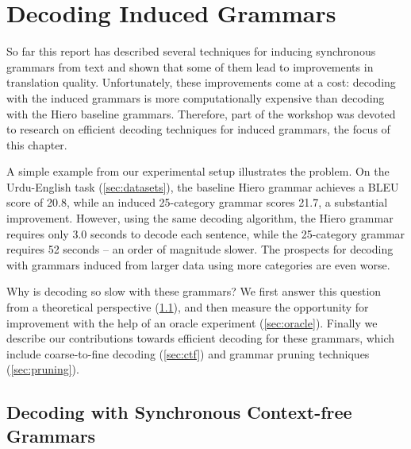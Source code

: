 \chapter{Decoding Induced Grammars}
\label{chap:decoding}


So far this report has described several techniques for inducing synchronous grammars from text and shown that some of them lead to improvements in translation quality.  Unfortunately, these improvements come at a cost: decoding with the induced grammars is more computationally expensive than decoding with the Hiero baseline grammars.  Therefore, part of the workshop was devoted to research on efficient decoding techniques for induced grammars, the focus of this chapter.

A simple example from our experimental setup illustrates the problem.  On the Urdu-English task (\textsection\ref{sec:datasets}), the baseline Hiero grammar achieves a BLEU score of 20.8, while an induced 25-category grammar scores 21.7, a substantial improvement.  However, using the same decoding algorithm, the Hiero grammar requires only 3.0 seconds to decode each sentence, while the 25-category grammar requires 52 seconds -- an order of magnitude slower.  The prospects for decoding with grammars induced from larger data using more categories are even worse.

Why is decoding so slow with these grammars?  We first answer this question from a theoretical perspective (\textsection\ref{sec:overview}), and then measure the opportunity for improvement with the help of an oracle experiment (\textsection\ref{sec:oracle}).  Finally we describe our contributions towards efficient decoding for these grammars, which include coarse-to-fine decoding (\textsection\ref{sec:ctf}) and grammar pruning techniques (\textsection\ref{sec:pruning}).

\section{Decoding with Synchronous Context-free Grammars} \label{sec:overview}

